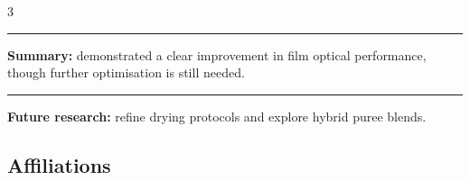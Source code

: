 \documentclass[
]{ImperialPoster}
\begin{document}
\begin{multicols}{3}
\vspace{-1.2\baselineskip}

\begin{center}
  \textcolor{ICLBlue}{\rule{\linewidth}{0.2pt}} %
  \vspace{1mm}
  \textcolor{ICLBlue}{\textbf{Summary:}} demonstrated a clear improvement in film optical performance, though further optimisation is still needed.
  \vspace{1mm}
  \textcolor{ICLBlue}{\rule{\linewidth}{0.2pt}} %
\end{center}



\vspace{-1.2\baselineskip}
\textbf{\textcolor{ICLBlue}{ Future research:}}  refine drying protocols and explore hybrid puree blends.
  
	
	
	\subsection{Affiliations}
	
	\\
    \hspace{1mm}

\vspace{-1.2\baselineskip}

\end{multicols}
\end{document}
